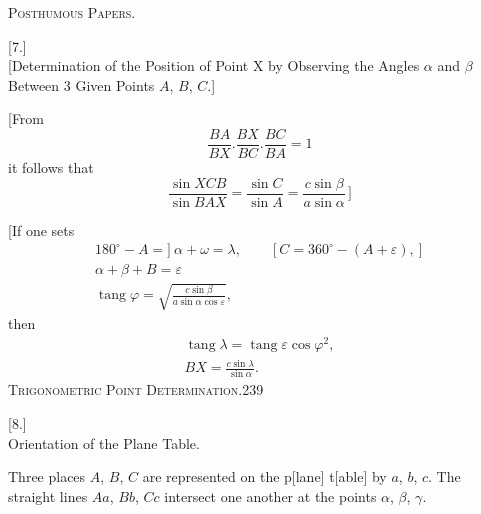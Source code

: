 \clearpage
{}\hfill\textsc{Posthumous Papers.}\hfill\mbox{}\par
\vspace{1.5cm}
\begin{center}{\Large{}}\end{center}
\bigskip
\begin{center}[7.]\\[5pt]
[Determination of the Position of Point X by Observing the Angles $\alpha$ and $\beta$ Between 3 Given Points $A$, $B$, $C$.]
\end{center}
[From
\[
\frac{BA}{BX}.\frac{BX}{BC}.\frac{BC}{BA}=1
\]
it follows that
\[
\frac{\sin XCB}{\sin BAX}=\frac{\sin C}{\sin A}=\frac{c\sin\beta}{a\sin\alpha}\,\bigg]
\]
\begin{center}
\end{center}
[If one sets
\[
\begin{gathered}
180^\circ-A=]\ \alpha+\omega=\lambda,\qquad [C=360^\circ-(A+\varepsilon),]\\
\alpha+\beta+B=\varepsilon\\[5pt]
\operatorname{tang}\varphi=\sqrt{\frac{c\sin\beta}{a\sin\alpha\cos\varepsilon}},
\end{gathered}
\]
then
\[
\begin{gathered}
\operatorname{tang}\lambda=\operatorname{tang}\varepsilon\cos\varphi^2,\\
BX=\frac{c\sin\lambda}{\sin\alpha}.
\end{gathered}
\]
\clearpage
\noindent\mbox{}\hfill\textsc{Trigonometric Point Determination.}\hfill239\par\medskip
\begin{center}[8.]\\[5pt]Orientation of the Plane Table.\rlap{\hspace{.12em}\raisebox{1.15ex}{\scriptsize,}}\end{center}
Three places $A$, $B$, $C$ are represented on the p[lane] t[able] by $a$, $b$, $c$. The straight lines $Aa$, $Bb$, $Cc$ intersect one another at the points $\alpha$, $\beta$, $\gamma$.


